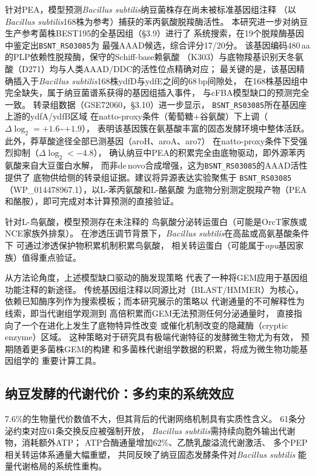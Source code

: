 \documentclass[10pt, a4paper, twocolumn]{ctexart}
\newcommand{\bs}{\textit{Bacillus subtilis}}
\begin{document}
针对PEA，模型预测\bs{}纳豆菌株存在尚未被标准基因组注释
（以\bs{}168株为参考）捕获的苯丙氨酸脱羧酶活性。
本研究进一步对纳豆生产参考菌株BEST195的全基因组（§3.9）进行了
系统搜索，在19个脱羧酶基因中鉴定出\texttt{BSNT\_RS03085}为
最强AAAD候选，综合评分17/20分。
该基因编码480\,aa的PLP依赖性脱羧酶，保守的Schiff-base赖氨酸
（K303）与底物羧基识别天冬氨酸（D271）均与人类AAAD/DDC的活性位点精确对应；
最关键的是，该基因精确插入于\bs{}168株ydfD与ydfE之间的68\,bp间隙处，
在168株基因组中完全缺失，属于纳豆菌谱系获得的基因组插入事件，
与cFBA模型缺口的预测完全一致。
转录组数据（GSE72060，§3.10）进一步显示，
\texttt{BSNT\_RS03085}所在基因座上游的ydfA/ydfB区域
在natto-proxy条件（葡萄糖+谷氨酸）下上调（$\Delta\log_2 = +1.6$\textasciitilde$+1.9$），
表明该基因簇在氨基酸丰富的固态发酵环境中整体活跃。
此外，莽草酸途径全部已测基因（aroH、aroA、aro7）
在natto-proxy条件下受强烈抑制（$\Delta\log_2 < -4.8$），
确认纳豆中PEA的积累完全由底物驱动，即外源苯丙氨酸来自大豆蛋白水解，
而非de\,novo合成增强，这为\texttt{BSNT\_RS03085}的AAAD活性提供了
底物供给侧的转录组证据。建议将异源表达实验聚焦于
\texttt{BSNT\_RS03085}（WP\_014478967.1），以L-苯丙氨酸和L-酪氨酸
为底物分别测定脱羧产物（PEA和酪胺），即可完成对本计算预测的直接验证。

针对L-鸟氨酸，模型预测存在未注释的
鸟氨酸分泌转运蛋白（可能是OrcT家族或NCE家族外排泵）。
在渗透压调节背景下，\bs{}在高盐或高氨基酸条件下
可通过渗透保护物积累机制积累鸟氨酸，
相关转运蛋白（可能属于\textit{opu}基因家族）值得重点验证。

从方法论角度，上述模型缺口驱动的酶发现策略
代表了一种将GEM应用于基因组功能注释的新途径。
传统基因组注释以同源比对（BLAST/HMMER）为核心，
依赖已知酶序列作为搜索模板；而本研究展示的策略以
代谢通量的不可解释性为线索，即当代谢组学观测到
高倍积累而GEM无法预测任何分泌通量时，
直接指向了一个在进化上发生了底物特异性改变
或催化机制改变的隐藏酶（cryptic enzyme）区域。
这种策略对于研究具有极端代谢特征的发酵微生物尤为有效，
预期随着更多菌株GEM的构建
和多菌株代谢组学数据的积累，将成为微生物功能基因组学的
重要计算工具。

\subsection{纳豆发酵的代谢代价：多约束的系统效应}

7.6\%的生物量代价数值不大，但其背后的代谢网络机制具有实质性含义。
61条分泌约束对应61条交换反应被强制开放，
\bs{}需持续向胞外输出代谢物，消耗额外ATP；
ATP合酶通量增加62\%、乙酰乳酸溢流代谢激活、
多个PEP相关转运体系通量大幅重塑，
共同反映了纳豆固态发酵条件对\bs{}
能量代谢格局的系统性重构。
\end{document}
